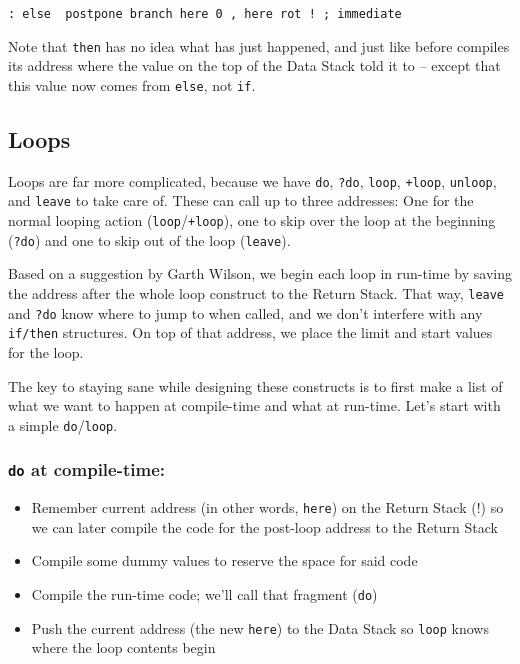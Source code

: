 \begin{lstlisting}[frame=single]
        : else  postpone branch here 0 , here rot ! ; immediate
\end{lstlisting}

Note that \texttt{then} has no idea what has just happened, and just like before
compiles its address where the value on the top of the Data Stack told it to --
except that this value now comes from \texttt{else}, not \texttt{if}. 


\subsection{Loops} 

Loops are far more complicated, because we have \texttt{do}, \texttt{?do},
\texttt{loop}, \texttt{+loop}, \texttt{unloop}, and \texttt{leave} to take care
of. These can call up to three addresses: One for the normal looping action
(\texttt{loop}/\texttt{+loop}), one to skip over the loop at the beginning
(\texttt{?do}) and one to skip out of the loop (\texttt{leave}). 

Based on a suggestion by Garth Wilson, we begin each loop in run-time by saving
the address after the whole loop construct to the Return Stack. That way,
\texttt{leave} and \texttt{?do} know where to jump to when called, and we don't
interfere with any \texttt{if/then} structures. On top of that address, we place
the limit and start values for the loop. 

The key to staying sane while designing these constructs is to first make
a list of what we want to happen at compile-time and what at run-time. Let's
start with a simple \texttt{do}/\texttt{loop}.

\subsubsection{\texttt{do} at compile-time:}

\begin{itemize}

        \item Remember current address (in other words, \texttt{here}) on the
                Return Stack (!) so we can later compile the code for the
                post-loop address to the Return Stack

        \item Compile some dummy values to reserve the space for said code

        \item Compile the run-time code; we'll call that fragment (\texttt{do})

        \item Push the current address (the new \texttt{here}) to the Data Stack
                so \texttt{loop} knows where the loop contents begin

\end{itemize}


